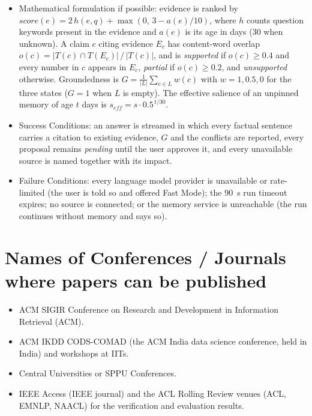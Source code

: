 \documentclass[oneside,a4paper,12pt]{report}
\begin{document}
\begin{itemize}
\item Mathematical formulation if possible: evidence is ranked by $\mathit{score}(e) = 2\,h(e, q) + \max(0,\, 3 - a(e)/10)$, where $h$ counts question keywords present in the evidence and $a(e)$ is its age in days (30 when unknown). A claim $c$ citing evidence $E_c$ has content-word overlap $o(c) = |T(c) \cap T(E_c)| \,/\, |T(c)|$, and is \emph{supported} if $o(c) \ge 0.4$ and every number in $c$ appears in $E_c$, \emph{partial} if $o(c) \ge 0.2$, and \emph{unsupported} otherwise. Groundedness is $G = \frac{1}{|L|}\sum_{c \in L} w(c)$ with $w = 1, 0.5, 0$ for the three states ($G = 1$ when $L$ is empty). The effective salience of an unpinned memory of age $t$ days is $s_{\mathit{eff}} = s \cdot 0.5^{\,t/30}$.
\item Success Conditions: an answer is streamed in which every factual sentence carries a citation to existing evidence, $G$ and the conflicts are reported, every proposal remains \emph{pending} until the user approves it, and every unavailable source is named together with its impact.
\item Failure Conditions: every language model provider is unavailable or rate-limited (the user is told so and offered Fast Mode); the 90~s run timeout expires; no source is connected; or the memory service is unreachable (the run continues without memory and says so).
\end{itemize}


\section{Names of Conferences / Journals where papers can be published}
\begin{itemize}
\item  ACM SIGIR Conference on Research and Development in Information Retrieval (ACM).
\item  ACM IKDD CODS-COMAD (the ACM India data science conference, held in India) and workshops at IITs.
\item  Central Universities or SPPU Conferences.
\item IEEE Access (IEEE journal) and the ACL Rolling Review venues (ACL, EMNLP, NAACL) for the verification and evaluation results.
\end{itemize}
\end{document}
